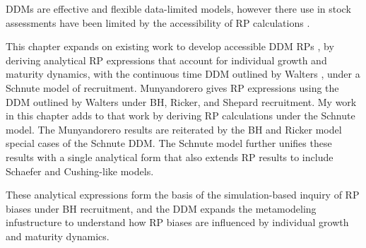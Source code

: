 DDMs are effective and flexible data-limited models, however there use in 
stock assessments have been limited by the accessibility of RP calculations 
\cite{munyandorero_analytical_2023}. %
 
This chapter expands on existing work to develop accessible DDM RPs \cite{dick_depletion-based_2011, munyandorero_analytical_2023},
by deriving analytical RP expressions that account for individual growth and
maturity dynamics, with the continuous time DDM outlined by Walters \cite{walters_continuous_2020}, 
under a Schnute model of recruitment. 
Munyandorero \cite{munyandorero_analytical_2023} gives RP expressions using 
the DDM outlined by Walters under BH, Ricker, and Shepard recruitment. 
My work in this chapter adds to that work by deriving RP calculations under 
the Schnute model. The Munyandorero results are reiterated by the BH and Ricker 
model special cases of the Schnute DDM. %
The Schnute model further unifies these results with a single analytical form that 
also extends RP results to include Schaefer and Cushing-like models. 

These analytical expressions form the basis of the simulation-based inquiry of 
RP biases under BH recruitment, and the DDM expands the metamodeling infustructure
to understand how RP biases are influenced by individual growth and maturity dynamics. 



